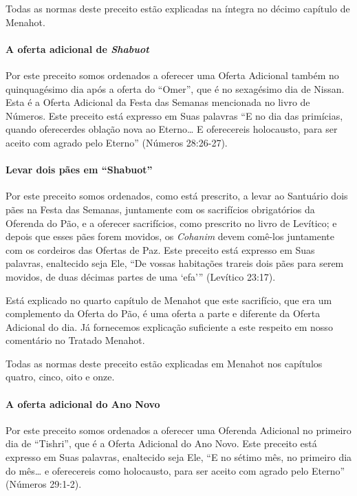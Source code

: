 Todas as normas deste preceito estão explicadas na íntegra no décimo
capítulo de Menahot.


\paragraph{A oferta adicional de \textit{Shabuot}}

Por este preceito somos ordenados a oferecer uma Oferta Adicional também
no quinquagésimo dia após a oferta do ``Omer'', que é no sexagésimo dia
de Nissan. Esta é a Oferta Adicional da Festa das Semanas mencionada no
livro de Números. Este preceito está expresso em Suas palavras ``E no
dia das primícias, quando oferecerdes oblação nova ao Eterno\ldots{} E
oferecereis holocausto, para ser aceito com agrado pelo Eterno''
(Números 28:26-27).

\paragraph{Levar dois pães em ``Shabuot''}

Por este preceito somos ordenados, como está prescrito, a levar ao
Santuário dois pães na Festa das Semanas, juntamente com os sacrifícios
obrigatórios da Oferenda do Pão, e a oferecer sacrifícios, como
prescrito no livro de Levítico; e depois que esses pães forem movidos,
os \textit{Cohanim} devem comê-los juntamente com os cordeiros das Ofertas de
Paz. Este preceito está expresso em Suas palavras, enaltecido seja Ele,
``De vossas habitações trareis dois pães para serem movidos, de duas
décimas partes de uma `efa''' (Levítico 23:17).

Está explicado no quarto capítulo de Menahot que este sacrifício, que
era um complemento da Oferta do Pão, é uma oferta a parte e diferente da
Oferta Adicional do dia. Já fornecemos explicação suficiente a este
respeito em nosso comentário no Tratado Menahot.

Todas as normas deste preceito estão explicadas em Menahot nos capítulos
quatro, cinco, oito e onze.

\paragraph{A oferta adicional do Ano Novo}

Por este preceito somos ordenados a oferecer uma Oferenda Adicional no
primeiro dia de ``Tishri'', que é a Oferta Adicional do Ano Novo. Este
preceito está expresso em Suas palavras, enaltecido seja Ele, ``E no
sétimo mês, no primeiro dia do mês\ldots{} e oferecereis como holocausto,
para ser aceito com agrado pelo Eterno'' (Números 29:1-2).

